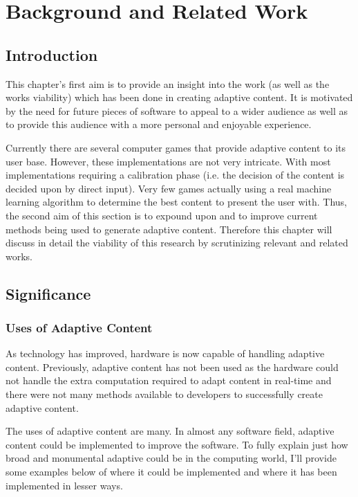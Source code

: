 \documentclass[11pt]{article}
\begin{document}
\clearpage

\section{Background and Related Work}
\subsection{Introduction}
This chapter's first aim is to provide an insight into the work (as well as the works viability) which has been done in creating adaptive content. It is motivated by the need for future pieces of software to appeal to a wider audience as well as to provide this audience with a more personal and enjoyable experience.
\vspace{7.0 mm}

Currently there are several computer games that provide adaptive content to its user base. However, these implementations are not very intricate. With most implementations requiring a calibration phase (i.e. the decision of the content is decided upon by direct input). Very few games actually using a real machine learning algorithm to determine the best content to present the user with. Thus, the second aim of this section is to expound upon and to improve current methods being used to generate adaptive content. Therefore this chapter will discuss in detail the viability of this research by scrutinizing relevant and related works.
\vspace{7.0 mm}

\subsection{Significance}
\subsubsection{Uses of Adaptive Content}

As technology has improved, hardware is now capable of handling adaptive content. Previously, adaptive content has not been used as the hardware could not handle the extra computation required to adapt content in real-time and there were not many methods available to developers to successfully create adaptive content.
\vspace{7.0 mm}

The uses of adaptive content are many. In almost any software field, adaptive content could be implemented to improve the software. To fully explain just how broad and monumental adaptive could be in the computing world, I'll provide some examples below of where it could be implemented and where it has been implemented in lesser ways.
\end{document}
